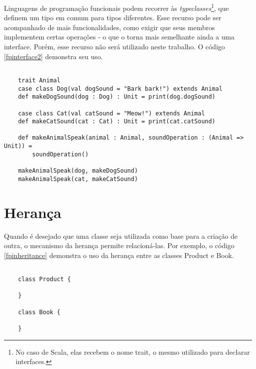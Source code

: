 Linguagens de programação funcionais podem 
recorrer às \textit{typeclasses}\footnote{
    No caso de Scala, elas recebem o nome trait, 
    o mesmo utilizado para declarar interfaces.
}, que definem um tipo em comum para tipos 
diferentes. Esse recurso pode ser acompanhado 
de mais funcionalidades, como exigir que seus 
membros implementem certas operações - o que 
o torna mais semelhante ainda a uma interface. 
Porém, esse recurso não será utilizado neste 
trabalho. O código \ref{fpinterface2} demonstra 
seu uso.


\begin{lstlisting}[caption={Interfaces em Programação Funcional},label=fpinterface2]
    
    trait Animal
    case class Dog(val dogSound = "Bark bark!") extends Animal
    def makeDogSound(dog : Dog) : Unit = print(dog.dogSound)
    
    case class Cat(val catSound = "Meow!") extends Animal
    def makeCatSound(cat : Cat) : Unit = print(cat.catSound)

    def makeAnimalSpeak(animal : Animal, soundOperation : (Animal => Unit)) =
        soundOperation()
    
    makeAnimalSpeak(dog, makeDogSound)
    makeAnimalSpeak(cat, makeCatSound)

\end{lstlisting}


\section{Herança}

Quando é desejado que uma classe seja 
utilizada como base para a criação de outra, 
o mecanismo da herança permite relacioná-las\cite{quarkoo}. 
Por exemplo, o código \ref{fpinheritance} demonstra 
o uso da herança entre as classes Product e Book.

\begin{lstlisting}[caption={Herança em Programação Funcional},label=fpinheritance]
    
    class Product {

    }

    class Book {

    }

\end{lstlisting}

